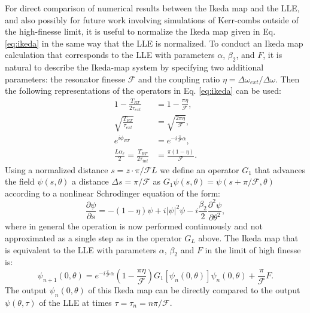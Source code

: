 For direct comparison of numerical results between the Ikeda map and the LLE, and also possibly for future work involving simulations of Kerr-combs outside of the high-finesse limit, it is useful to normalize the Ikeda map given in Eq. \ref{eq:ikeda} in the same way that the LLE is normalized. To conduct an Ikeda map calculation that corresponds to the LLE with parameters $\alpha$, $\beta_2$, and $F$, it is natural to describe the Ikeda-map system by specifying two additional parameters: the resonator finesse $\mathcal{F}$ and the coupling ratio $\eta=\Delta\omega_{ext}/\Delta\omega$. Then the following representations of the operators in Eq. \ref{eq:ikeda} can be used:
\begin{align}
1-\frac{T_{RT}}{2\tau_{ext}}&=1-\frac{\pi\eta}{\mathcal{F}},\\
\sqrt{\frac{T_{RT}}{\tau_{ext}}}&=\sqrt{\frac{2\pi\eta}{\mathcal{F}}},\\
e^{i\phi_{RT}}&=e^{-i\frac{\pi}{\mathcal{F}}\alpha},\\
\frac{L\alpha_\ell}{2}=\frac{T_{RT}}{2\tau_{int}}&=\frac{\pi(1-\eta)}{\mathcal{F}}.
\end{align}
Using a normalized distance $s=z\cdot \pi/\mathcal{F}L$ we define an operator $G_1$ that advances the field $\psi(s,\theta)$ a distance $\Delta s=\pi/\mathcal{F}$ as $G_1 \psi(s,\theta)=\psi(s+\pi/\mathcal{F},\theta)$ according to a nonlinear Schrodinger equation of the form:
\begin{equation}
\frac{\partial \psi}{\partial s}= -(1-\eta) \psi+i|\psi|^2 \psi -i \frac{\beta_2}{2} \frac{\partial^2 \psi}{\partial \theta^2},
\end{equation}
where in general the operation is now performed continuously and not approximated as a single step as in the operator $G_L$ above. The Ikeda map that is equivalent to the LLE with parameters $\alpha$, $\beta_2$ and $F$ in the limit of high finesse is:
\begin{equation}
\psi_{n+1}(0,\theta)=e^{-i\frac{\pi}{\mathcal{F}}\alpha}\left(1-\frac{\pi\eta}{\mathcal{F}}\right)G_1\left[\psi_n(0,\theta)\right]\psi_n(0,\theta)+\frac{\pi}{\mathcal{F}}F.
\end{equation}
The output $\psi_n(0,\theta)$ of this Ikeda map can be directly compared to the output $\psi(\theta,\tau)$ of the LLE at times $\tau=\tau_n=n\pi/\mathcal{F}$.

%
%
%
%

